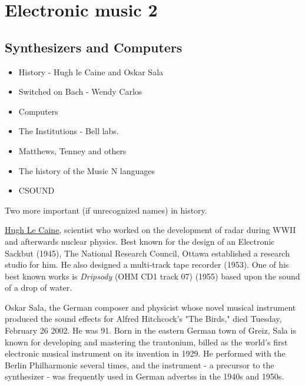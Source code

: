 
\chapter{Electronic music 2}
\label{history3}

\section{Synthesizers and Computers}
\begin{itemize}
\item History - Hugh le Caine and Oskar Sala
\item Switched on Bach - Wendy Carlos
\item Computers
\item The Institutions - Bell labs.
\item Matthews, Tenney and others
\item The history of the Music N languages
\item CSOUND
\end{itemize}

Two more important (if unrecognized names) in history.

\href{http://www.hughlecaine.com}{Hugh Le Caine}, scientist who worked on the development of radar during WWII and afterwards nuclear physics. Best known for the design of an Electronic Sackbut (1945), The National Research Council, Ottawa established a research studio for him. He also designed a multi-track tape recorder (1953). One of his best known works is \textit{Dripsody} (OHM CD1 track 07) (1955) based upon the sound of a drop of water.

Oskar Sala, the German composer and physicist whose novel musical instrument produced the sound effects for Alfred Hitchcock's "The Birds," died Tuesday, February 26 2002. He was 91. Born in the eastern German town of Greiz, Sala is known for developing and mastering the trautonium, billed as the world's first electronic musical instrument on its invention in 1929. He performed with the Berlin Philharmonic several times, and the instrument - a precursor to the synthesizer - was frequently used in German advertss in the 1940s and 1950s.

